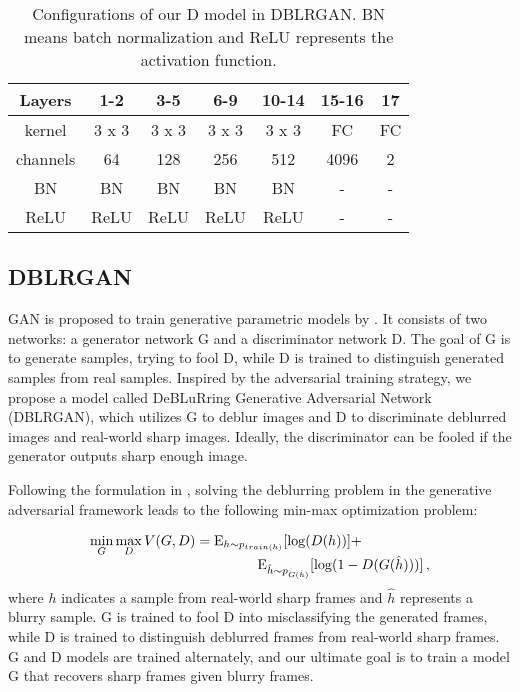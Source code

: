 \documentclass[journal]{IEEEtran}
\begin{document}
\begin{table}
\centering
   \scriptsize
   \caption{Configurations of our D model in DBLRGAN. BN means batch normalization and ReLU represents the activation function.}
    \begin{tabular}{c|cccccc}
    \toprule
     Layers & 1-2 & 3-5 & 6-9 & 10-14 & 15-16 & 17 \\
     \midrule
     kernel & 3 x 3 & 3 x 3 & 3 x 3 & 3 x 3 & FC & FC \\
     channels & 64 & 128 & 256 & 512 & 4096 & 2 \\
     BN & BN & BN & BN & BN & - & - \\
     ReLU & ReLU & ReLU & ReLU & ReLU & - & - \\
    \bottomrule
    \end{tabular}
  \label{table2}
\end{table}



\subsection{DBLRGAN}
GAN is proposed to train generative parametric models by \cite{goodfellow2014generative}. It consists of two networks: a generator network G and a discriminator network D. The goal of G is to generate samples, trying to fool D, while D is trained to distinguish generated samples from real samples. Inspired by the adversarial training strategy, we propose a model called DeBLuRring Generative Adversarial Network (DBLRGAN), which utilizes G to deblur images and D to discriminate deblurred images and real-world sharp images. Ideally, the discriminator can be fooled if the generator outputs sharp enough image.

Following the formulation in \cite{goodfellow2014generative}, solving the deblurring problem in the generative adversarial framework leads to the following min-max optimization problem:

\begin{equation}
\begin{array}{l}
\mathop {\min }\limits_G \mathop {\max }\limits_D V(G,D) = {{\rm E}_{h \sim {p_{train(h)}}}}[\log (D(h))] + \\
\ \ \ \ \ \ \ \ \ \ \ \ \ \ \ \ \ \ \ \ \ \ \ \ \ \ \ \ \ \ \ \ \ \ \ \ {{\rm E}_{\hat{h} \sim {p_{G(\hat{h})}}}}[\log (1 - D(G(\hat{h})))]\, ,
\end{array}
\end{equation}
where $h$ indicates a sample from real-world sharp frames and $\hat{h}$ represents a blurry sample. G is trained to fool D into misclassifying the generated frames, while D is trained to distinguish deblurred frames from real-world sharp frames. G and D models are trained alternately, and our ultimate goal is to train a model G that recovers sharp frames given blurry frames.
\end{document}
